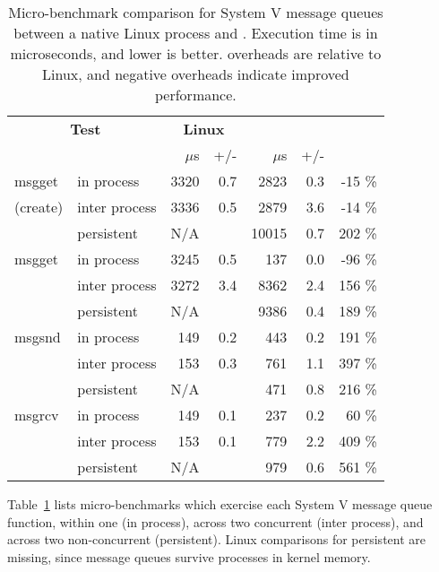 \begin{table}[t!b!]
\footnotesize
\centering
\begin{tabular}{|ll|rr|rrr|}
\hline
\multicolumn{2}{|c|}{{\bf Test}} &
\multicolumn{2}{|c|}{{\bf Linux}} &
\multicolumn{3}{|c|}{{\bf \sysname{}}} \\
 & & $\mu$s & +/- & $\mu$s & +/- & \\
\hline
msgget & in process	&	3320	& 0.7 &	2823	& 0.3 &	-15	\%	\\
(create) & inter process	&	3336	& 0.5 &	2879	& 3.6 &	-14	\%	\\
            & persistent	&	N/A	& &	10015	& 0.7 &	202	\%	\\
\hline								
msgget & in process	&	3245	& 0.5 &	137	& 0.0 &	-96	\%	\\
            & inter process	&	3272	& 3.4 &	8362	& 2.4 &	156	\%	\\
            & persistent	&	N/A	& &	9386	& 0.4 &	189	\%	\\
\hline								
msgsnd & in process	&	149	& 0.2 &	443	& 0.2 &	191	\%	\\
             & inter process	&	153	& 0.3 &	761	& 1.1 &	397	\%	\\
             & persistent	&	N/A	& &	471	& 0.8 &	216	\%	\\
\hline								
msgrcv & in process	&	149	& 0.1 &	237	& 0.2 &	60	\%	\\
            & inter process	&	153	& 0.1 &	779	& 2.2 &	409	\%	\\
            & persistent	&	N/A	& &	979	& 0.6 &	561	\%	\\\hline
\end{tabular}
\caption[\sysname{}: micro-benchmark for System V message queues]
{Micro-benchmark comparison for System V message queues
between a native Linux process and \sysname{} \picoprocs{}.
Execution time is in microseconds, and lower is better.
overheads are relative to Linux, and negative overheads indicate improved performance.}
\label{tab:graphene:msgq}
\end{table}

\vspace{5pt}
Table~\ref{tab:graphene:msgq} lists micro-benchmarks
which exercise each System V message queue function,
within one \picoproc{} (in process), across two concurrent \picoprocs{} (inter process),
and across two non-concurrent \picoprocs{} (persistent).
Linux comparisons for persistent are missing, since message queues 
survive processes in kernel memory.

